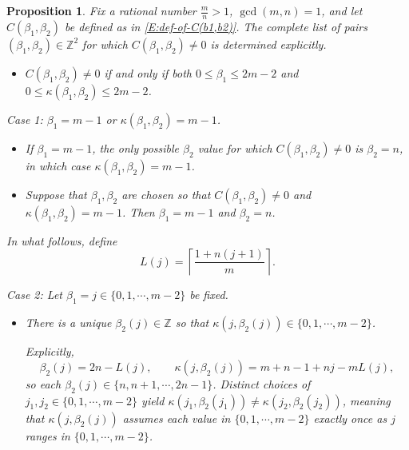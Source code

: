 \documentclass[letterpaper,11pt,reqno]{amsart}
\theoremstyle{plain}
\newtheorem{proposition}[equation]{Proposition}
\theoremstyle{definition}
\theoremstyle{remark}
\theoremstyle{remark}
\numberwithin{equation}{section}
\newcommand{\Z}{{\mathbb Z}}
\begin{document}
\begin{proposition}\label{P:Finding-effective-coefficients}
Fix a rational number $\frac{m}{n}>1$, $\gcd(m,n)=1$, and let $C(\beta_1,\beta_2)$ be defined as in \eqref{E:def-of-C(b1,b2)}.
The complete list of pairs $(\beta_1,\beta_2) \in \Z^2$ for which $C(\beta_1,\beta_2) \neq 0$ is determined explicitly.

\begin{itemize}
\item[(0)] $C(\beta_1,\beta_2) \neq 0$ if and only if both $0 \le \beta_1 \le 2m-2$ and $0 \le \kappa(\beta_1,\beta_2) \le 2m-2$.
\end{itemize}

\noindent  Case 1: $\beta_1 = m-1$ or $\kappa(\beta_1,\beta_2) = m-1$.

\begin{itemize}
\item[(1a)] If $\beta_1 = m-1$, the only possible $\beta_2$ value for which $C(\beta_1,\beta_2) \neq 0$ is $\beta_2 = n$, in which case $\kappa(\beta_1,\beta_2) = m-1$.

\item[(1b)] Suppose that $\beta_1,\beta_2$ are chosen so that $C(\beta_1,\beta_2) \neq 0$ and $\kappa(\beta_1,\beta_2) = m-1$.
Then $\beta_1 = m-1$ and $\beta_2 = n$.
\end{itemize}

In what follows, define 
\begin{equation}\label{E:def-of-mn-ceiling-func}
L(j) = \left\lceil \frac{1+n(j+1)}{m} \right\rceil.
\end{equation}

\noindent  Case 2: Let $\beta_1 = j \in \{0,1,\cdots,m-2 \}$ be fixed.
\begin{itemize}

\item[(2a)] 
There is a unique $\beta_2(j) \in \Z$ so that $\kappa(j,\beta_2(j)) \in \{0,1,\cdots,m-2 \}$.

Explicitly, 
\begin{equation}
\beta_2(j) = 2n - L(j), \qquad \kappa(j,\beta_2(j)) = m + n -1 + nj - m L(j),
\end{equation}
so each $\beta_2(j) \in \{n,n+1, \cdots, 2n-1 \}$.
Distinct choices of $j_1,j_2 \in \{0,1,\cdots,m-2 \}$ yield $\kappa(j_1,\beta_2(j_1)) \neq \kappa(j_2,\beta_2(j_2))$, meaning that $\kappa(j,\beta_2(j))$ assumes each value in $\{0,1,\cdots,m-2 \}$ exactly once as $j$ ranges in $\{0,1,\cdots,m-2 \}$.


\end{itemize}
\end{proposition}
\end{document}

